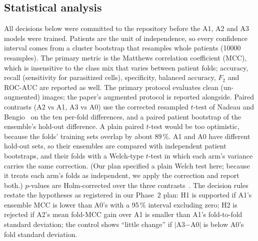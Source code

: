 \documentclass[conference]{IEEEtran}
\begin{document}
\subsection{Statistical analysis}
All decisions below were committed to the repository before the A1, A2 and A3 models were trained. Patients are the unit of independence, so every confidence interval comes from a cluster bootstrap that resamples whole patients (\num{10000} resamples). The primary metric is the Matthews correlation coefficient (MCC), which is insensitive to the class mix that varies between patient folds; accuracy, recall (sensitivity for parasitized cells), specificity, balanced accuracy, $F_2$ and ROC-AUC are reported as well. The primary protocol evaluates clean (un-augmented) images; the paper's augmented protocol is reported alongside. Paired contrasts (A2 vs A1, A3 vs A0) use the corrected resampled $t$-test of Nadeau and Bengio~\cite{nadeau2003} on the ten per-fold differences, and a paired patient bootstrap of the ensemble's hold-out difference. A plain paired $t$-test would be too optimistic, because the folds' training sets overlap by about 89\,\%. A1 and A0 have different hold-out sets, so their ensembles are compared with independent patient bootstraps, and their folds with a Welch-type $t$-test in which each arm's variance carries the same correction. (Our plan specified a plain Welch test here; because it treats each arm's folds as independent, we apply the correction and report both.) $p$-values are Holm-corrected over the three contrasts~\cite{holm1979}. The decision rules restate the hypotheses as registered in our Phase~2 plan: H1 is supported if A1's ensemble MCC is lower than A0's with a 95\,\% interval excluding zero; H2 is rejected if A2's mean fold-MCC gain over A1 is smaller than A1's fold-to-fold standard deviation; the control shows ``little change'' if $|$A3$-$A0$|$ is below A0's fold standard deviation.
\end{document}
